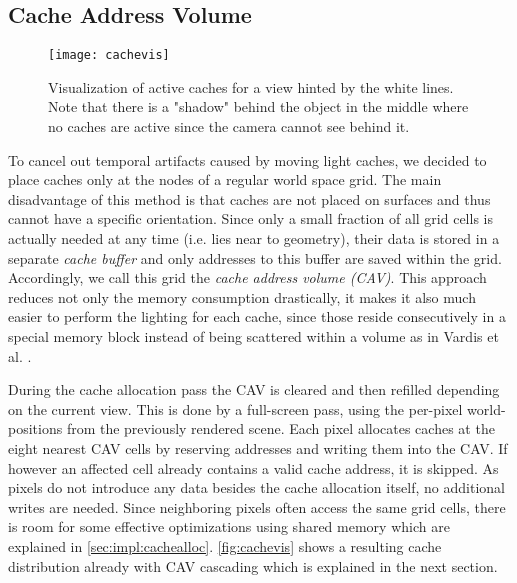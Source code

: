 \documentclass[thesis.tex]{subfiles}
\begin{document}
\subsection{Cache Address Volume}
\begin{figure}[h]
	\centering
	\texttt{[image: cachevis]}
	\caption{Visualization of active caches for a view hinted by the white lines. Note that there is a "shadow" behind the object in the middle where no caches are active since the camera cannot see behind it.} \label{fig:cachevis}
\end{figure}
To cancel out temporal artifacts caused by moving light caches, we decided to place caches only at the nodes of a regular world space grid.
The main disadvantage of this method is that caches are not placed on surfaces and thus cannot have a specific orientation.
Since only a small fraction of all grid cells is actually needed at any time (i.e. lies near to geometry), their data is stored in a separate \emph{cache buffer} and only addresses to this buffer are saved within the grid.
Accordingly, we call this grid the \emph{cache address volume (CAV)}.
This approach reduces not only the memory consumption drastically, it makes it also much easier to perform the lighting for each cache, since those reside consecutively in a special memory block instead of being scattered within a volume as in Vardis et al. \cite{bib:radiancecachechromaticcompression}.

During the cache allocation pass the CAV is cleared and then refilled depending on the current view.
This is done by a full-screen pass, using the per-pixel world-positions from the previously rendered scene. %
Each pixel allocates caches at the eight nearest CAV cells by reserving addresses and writing them into the CAV.
If however an affected cell already contains a valid cache address, it is skipped.
As pixels do not introduce any data besides the cache allocation itself, no additional writes are needed.
Since neighboring pixels often access the same grid cells, there is room for some effective optimizations using shared memory which are explained in \autoref{sec:impl:cachealloc}.
\autoref{fig:cachevis} shows a resulting cache distribution already with CAV cascading which is explained in the next section.
\end{document}
